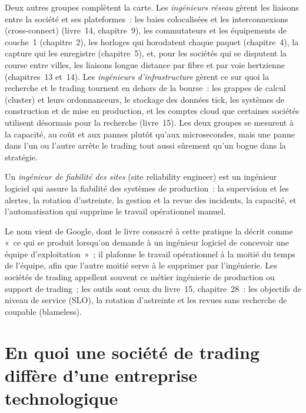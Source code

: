 Deux autres groupes complètent la carte. Les \emph{ingénieurs réseau} gèrent les liaisons entre la société et ses plateformes~: les baies colocalisées et les
interconnexions (cross-connect) (livre~14, chapitre~9), les commutateurs et les équipements de couche~1 (chapitre~2), les horloges qui horodatent
chaque paquet (chapitre~4), la capture qui les enregistre (chapitre~5), et, pour les sociétés qui se disputent la course entre villes, les
liaisons longue distance par fibre et par voie hertzienne (chapitres~13 et~14). Les \emph{ingénieurs d'infrastructure} gèrent ce sur quoi la recherche et le trading
tournent en dehors de la bourse~: les grappes de calcul (cluster) et leurs ordonnanceurs, le stockage des données tick, les systèmes de
construction et de mise en production, et les comptes cloud que certaines sociétés utilisent désormais pour la recherche (livre~15). Les deux groupes se mesurent à la capacité,
au coût et aux pannes plutôt qu'aux microsecondes, mais une panne dans l'un ou l'autre arrête le trading tout aussi sûrement qu'un bogue dans la stratégie.

\begin{definition}\label{def:in:software-engineer:sre}
Un \emph{ingénieur de fiabilité des sites} (site reliability engineer) est un ingénieur logiciel qui assure la fiabilité des
systèmes de production~: la supervision et les alertes, la rotation d'astreinte, la gestion et la revue des incidents, la capacité, et l'automatisation qui
supprime le travail opérationnel manuel.
\end{definition}

Le nom vient de Google, dont le livre consacré à cette pratique la décrit comme «~ce qui se produit lorsqu'on demande à un ingénieur logiciel
de concevoir une équipe d'exploitation~»~; il plafonne le travail opérationnel à la moitié du temps de l'équipe, afin que l'autre moitié
serve à le supprimer par l'ingénierie. Les sociétés de trading appellent souvent ce métier ingénierie de production ou support de trading~;
les outils sont ceux du livre~15, chapitre~28~: les objectifs de niveau de service (SLO), la rotation d'astreinte et les revues sans recherche de coupable (blameless).

\section{En quoi une société de trading diffère d'une entreprise technologique}

